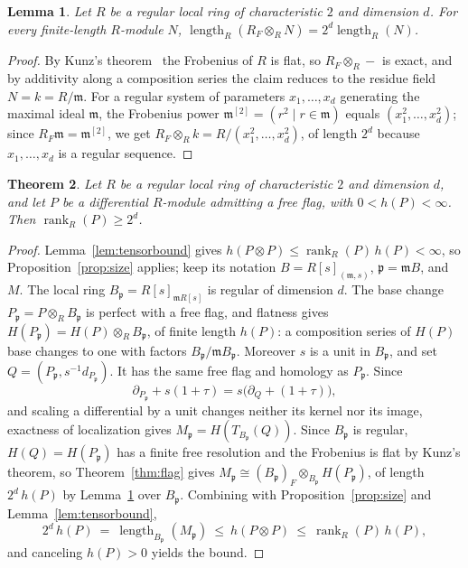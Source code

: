 \documentclass[11pt,reqno]{amsart}
\theoremstyle{plain}
\newtheorem{theorem}{Theorem}[section]
\newtheorem{lemma}[theorem]{Lemma}
\theoremstyle{definition}
\DeclareMathOperator{\length}{length}
\DeclareMathOperator{\rank}{rank}
\newcommand{\Tate}{T}                 %
\newcommand{\Rone}{R_F}               %
\newcommand{\htot}{h}
\begin{document}
\begin{lemma}\label{lem:scaling}
Let $R$ be a regular local ring of characteristic $2$ and dimension $d$.  For every finite-length
$R$-module $N$, $\length_R(\Rone\otimes_RN)=2^{d}\length_R(N)$.
\end{lemma}

\begin{proof}
By Kunz's theorem~\cite[Theorem~2.1]{Kunz} the Frobenius of $R$ is flat, so $\Rone\otimes_R-$ is exact,
and by additivity along a composition series the claim reduces to the residue field
$N=k=R/\mathfrak m$.  For a
regular system of parameters $x_1,\dots,x_d$ generating the maximal ideal $\mathfrak m$, the Frobenius
power $\mathfrak m^{[2]}=(r^2\mid r\in\mathfrak m)$ equals $(x_1^2,\dots,x_d^2)$; since
$\Rone\mathfrak m=\mathfrak m^{[2]}$, we get $\Rone\otimes_Rk=R/(x_1^2,\dots,x_d^2)$, of length $2^{d}$
because $x_1,\dots,x_d$ is a regular sequence.
\end{proof}

\begin{theorem}\label{thm:rank}
Let $R$ be a regular local ring of characteristic $2$ and dimension $d$, and let $P$ be a differential
$R$-module admitting a free flag, with $0<\htot(P)<\infty$.  Then $\rank_R(P)\ge2^{d}$.
\end{theorem}

\begin{proof}
Lemma~\ref{lem:tensorbound} gives $\htot(P\otimes P)\le\rank_R(P)\,\htot(P)<\infty$, so
Proposition~\ref{prop:size} applies; keep its notation $B=R[s]_{(\mathfrak m,s)}$,
$\mathfrak p=\mathfrak mB$, and $M$.  The local ring $B_{\mathfrak p}=R[s]_{\mathfrak mR[s]}$ is
regular of dimension $d$.  The base change $P_{\mathfrak p}=P\otimes_RB_{\mathfrak p}$ is perfect
with a free flag, and flatness gives $H(P_{\mathfrak p})=H(P)\otimes_RB_{\mathfrak p}$, of finite
length $\htot(P)$: a composition series of $H(P)$ base changes to one with factors
$B_{\mathfrak p}/\mathfrak mB_{\mathfrak p}$.  Moreover $s$ is a unit in $B_{\mathfrak p}$, and
set $Q=(P_{\mathfrak p},s^{-1}d_{P_{\mathfrak p}})$.  It has the same free flag and homology as
$P_{\mathfrak p}$.  Since
\[
 \partial_{P_{\mathfrak p}}+s(1+\tau)=s\bigl(\partial_Q+(1+\tau)\bigr),
\]
and scaling a differential by a unit changes neither its kernel nor its image, exactness of
localization gives $M_{\mathfrak p}=H(\Tate_{B_{\mathfrak p}}(Q))$.  Since $B_{\mathfrak p}$ is
regular, $H(Q)=H(P_{\mathfrak p})$ has a finite free resolution and the Frobenius is flat by Kunz's
theorem, so Theorem~\ref{thm:flag} gives
$M_{\mathfrak p}\cong(B_{\mathfrak p})_F\otimes_{B_{\mathfrak p}}H(P_{\mathfrak p})$, of length
$2^{d}\,\htot(P)$ by Lemma~\ref{lem:scaling} over $B_{\mathfrak p}$.  Combining with
Proposition~\ref{prop:size} and Lemma~\ref{lem:tensorbound},
\[
2^{d}\,\htot(P)\ =\ \length_{B_{\mathfrak p}}(M_{\mathfrak p})\ \le\ \htot(P\otimes P)\ \le\
\rank_R(P)\,\htot(P),
\]
and canceling $\htot(P)>0$ yields the bound.
\end{proof}
\end{document}

